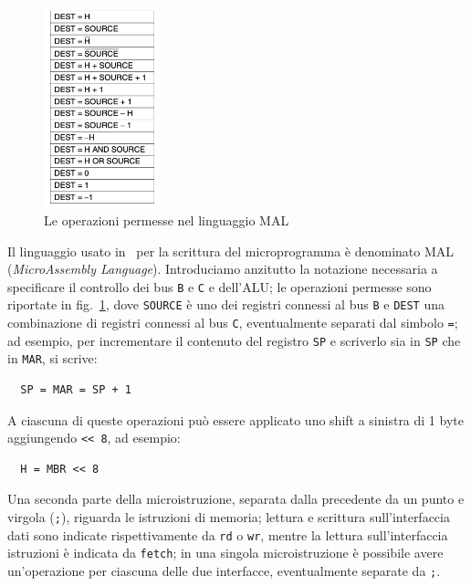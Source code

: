 \documentclass[a4paper,12pt]{scrreprt}
\begin{document}
\begin{figure}
  \centering
  \includegraphics[width=0.3\textwidth]{mal_ops.png}
  \caption{Le operazioni permesse nel linguaggio MAL}\label{fig:mal_ops}
\end{figure}

Il linguaggio usato in~\cite{tanenbaum} per la scrittura del microprogramma è
denominato MAL (\textit{MicroAssembly Language}). Introduciamo anzitutto la
notazione necessaria a specificare il controllo dei bus \lstinline{B} e
\lstinline{C} e dell'ALU; le operazioni permesse sono riportate in
fig.~\ref{fig:mal_ops}, dove \lstinline{SOURCE} è uno dei registri connessi al
bus \lstinline{B} e \lstinline{DEST} una combinazione di registri connessi al
bus \lstinline{C}, eventualmente separati dal simbolo \lstinline{=}; ad esempio,
per incrementare il contenuto del registro \lstinline{SP} e scriverlo sia in
\lstinline{SP} che in \lstinline{MAR}, si scrive:

\begin{lstlisting}
  SP = MAR = SP + 1
\end{lstlisting}

A ciascuna di queste operazioni può essere applicato uno shift a sinistra di 1 byte
aggiungendo \lstinline{<< 8}, ad esempio:

\begin{lstlisting}
  H = MBR << 8
\end{lstlisting}

Una seconda parte della microistruzione, separata dalla precedente da un punto e
virgola (\lstinline{;}), riguarda le istruzioni di memoria; lettura e scrittura
sull'interfaccia dati sono indicate rispettivamente da \lstinline{rd} o
\lstinline{wr}, mentre la lettura sull'interfaccia istruzioni è indicata da
\lstinline{fetch}; in una singola microistruzione è possibile avere
un'operazione per ciascuna delle due interfacce, eventualmente separate da
\lstinline{;}.
\end{document}
